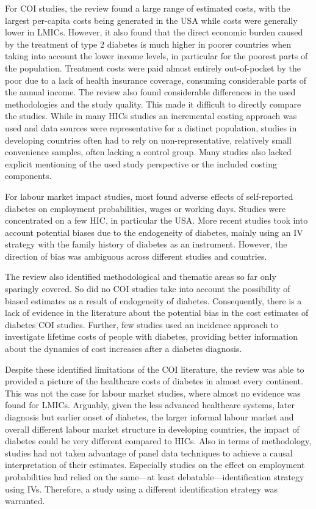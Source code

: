 For \ac{COI} studies, the review found a large range of estimated costs, with the largest per-capita costs being generated in the USA while costs were generally lower in \acp{LMIC}. However, it also found that the direct economic burden caused by the treatment of type 2 diabetes is much higher in poorer countries when taking into account the lower income levels, in particular for the poorest parts of the population. Treatment costs were paid almost entirely out-of-pocket by the poor due to a lack of health insurance coverage, consuming considerable parts of the annual income.  The review also found considerable differences in the used methodologies and the study quality. This made it difficult to directly compare the studies. While in many \acp{HIC} studies an incremental costing approach was used and data sources were representative for a distinct population, studies in developing countries often had to rely on non-representative, relatively small convenience samples, often lacking a control group. Many studies also lacked explicit mentioning of the used study perspective or the included costing components. 

For labour market impact studies, most found adverse effects of self-reported diabetes on employment probabilities, wages or working days. Studies were concentrated on a few \ac{HIC}, in particular the USA. More recent studies took into account potential biases due to the endogeneity of diabetes, mainly using an \ac{IV} strategy with the family history of diabetes as an instrument. However, the direction of bias was ambiguous across different studies and countries. 

The review also identified methodological and thematic areas so far only sparingly covered. So did no \ac{COI} studies take into account the possibility of biased estimates as a result of endogeneity of diabetes. Consequently, there is a lack of evidence in the literature about the potential bias in the cost estimates of diabetes \ac{COI} studies. Further, few studies used an incidence approach to investigate lifetime costs of people with diabetes, providing better information about the dynamics of cost increases after a diabetes diagnosis. 

Despite these identified limitations of the \ac{COI} literature, the review was able to provided a picture of the healthcare costs of diabetes in almost every continent. This was not the case for labour market studies, where almost no evidence was found for \acp{LMIC}. Arguably, given the less advanced healthcare systems, later diagnosis but earlier onset of diabetes, the larger informal labour market and overall different labour market structure in developing countries, the impact of diabetes could be very different compared to \acp{HIC}. Also in terms of methodology, studies had not taken advantage of panel data techniques to achieve a causal interpretation of their estimates. Especially studies on the effect on employment probabilities had relied on the same---at least debatable---identification strategy using \acp{IV}. Therefore, a study using a different identification strategy was warranted.

